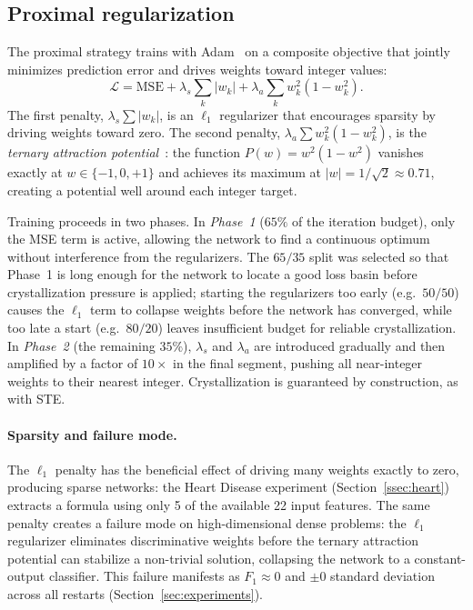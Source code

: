 \documentclass[lettersize,journal]{IEEEtran}
\begin{document}
\subsection{Proximal regularization}
\label{ssec:proximal}

The proximal strategy trains with Adam~\cite{kingma2015} on a composite
objective that jointly minimizes prediction error and drives weights toward
integer values:
\begin{equation}
  \mathcal{L} = \mathrm{MSE}
    + \lambda_s \sum_k |w_k|
    + \lambda_a \sum_k w_k^2(1 - w_k^2).
  \label{eq:proximal}
\end{equation}
The first penalty, $\lambda_s \sum|w_k|$, is an $\ell_1$ regularizer that
encourages sparsity by driving weights toward zero.
The second penalty, $\lambda_a \sum w_k^2(1-w_k^2)$, is the \emph{ternary
attraction potential}~\cite{parikh2014}: the function $P(w) = w^2(1-w^2)$
vanishes exactly at $w \in \{-1, 0, +1\}$ and achieves its maximum at
$|w| = 1/\sqrt{2} \approx 0.71$, creating a potential well around each
integer target.

Training proceeds in two phases.
In \emph{Phase~1} ($65\%$ of the iteration budget), only the MSE term is
active, allowing the network to find a continuous optimum without
interference from the regularizers.
The $65/35$ split was selected so that Phase~1 is long enough for the
network to locate a good loss basin before crystallization pressure is
applied; starting the regularizers too early (e.g.\ $50/50$) causes the
$\ell_1$ term to collapse weights before the network has converged, while
too late a start (e.g.\ $80/20$) leaves insufficient budget for reliable
crystallization.
In \emph{Phase~2} (the remaining $35\%$), $\lambda_s$ and $\lambda_a$ are
introduced gradually and then amplified by a factor of $10\times$ in the
final segment, pushing all near-integer weights to their nearest integer.
Crystallization is guaranteed by construction, as with STE.

\paragraph{Sparsity and failure mode.}
The $\ell_1$ penalty has the beneficial effect of driving many weights exactly
to zero, producing sparse networks: the Heart Disease experiment (Section~\ref{ssec:heart})
extracts a formula using only 5 of the available 22 input features.
The same penalty creates a failure mode on high-dimensional dense problems:
the $\ell_1$ regularizer eliminates discriminative weights before
the ternary attraction potential can stabilize a non-trivial solution,
collapsing the network to a constant-output classifier.
This failure manifests as $F_1 \approx 0$ and $\pm 0$ standard deviation across
all restarts (Section~\ref{sec:experiments}).
\end{document}
